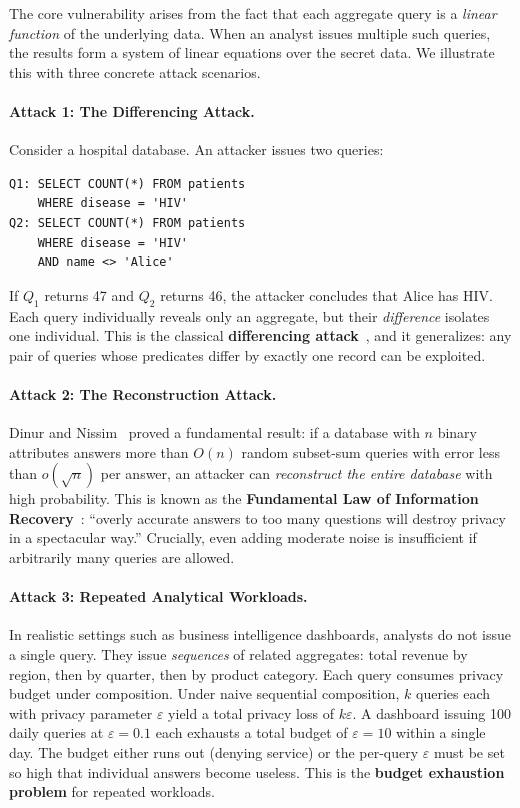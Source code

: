 \documentclass[sigconf,nonacm]{acmart}
\begin{document}
The core vulnerability arises from the fact that each aggregate query is a \emph{linear function} of the underlying data. When an analyst issues multiple such queries, the results form a system of linear equations over the secret data. We illustrate this with three concrete attack scenarios.

\paragraph{Attack 1: The Differencing Attack.}
Consider a hospital database. An attacker issues two queries:
\begin{lstlisting}
Q1: SELECT COUNT(*) FROM patients
    WHERE disease = 'HIV'
Q2: SELECT COUNT(*) FROM patients
    WHERE disease = 'HIV'
    AND name <> 'Alice'
\end{lstlisting}
If $Q_1$ returns 47 and $Q_2$ returns 46, the attacker concludes that Alice has HIV. Each query individually reveals only an aggregate, but their \emph{difference} isolates one individual. This is the classical \textbf{differencing attack}~\cite{denning1979tracker}, and it generalizes: any pair of queries whose predicates differ by exactly one record can be exploited.

\paragraph{Attack 2: The Reconstruction Attack.}
Dinur and Nissim~\cite{dinur2003revealing} proved a fundamental result: if a database with $n$ binary attributes answers more than $O(n)$ random subset-sum queries with error less than $o(\sqrt{n})$ per answer, an attacker can \emph{reconstruct the entire database} with high probability. This is known as the \textbf{Fundamental Law of Information Recovery}~\cite{dwork2017exposed}: ``overly accurate answers to too many questions will destroy privacy in a spectacular way.'' Crucially, even adding moderate noise is insufficient if arbitrarily many queries are allowed.

\paragraph{Attack 3: Repeated Analytical Workloads.}
In realistic settings such as business intelligence dashboards, analysts do not issue a single query. They issue \emph{sequences} of related aggregates: total revenue by region, then by quarter, then by product category. Each query consumes privacy budget under composition. Under naive sequential composition, $k$ queries each with privacy parameter $\varepsilon$ yield a total privacy loss of $k\varepsilon$. A dashboard issuing 100 daily queries at $\varepsilon = 0.1$ each exhausts a total budget of $\varepsilon = 10$ within a single day. The budget either runs out (denying service) or the per-query $\varepsilon$ must be set so high that individual answers become useless. This is the \textbf{budget exhaustion problem} for repeated workloads.
\end{document}
